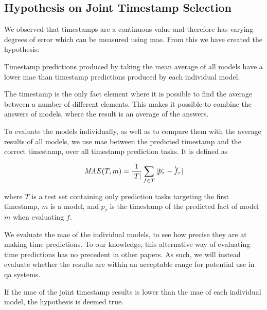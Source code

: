 \subsection{Hypothesis on Joint Timestamp Selection}
\label{sec:hypothesis_timestamp_voting}

We observed that timestamps are a continuous value and therefore has varying degrees of error which can be measured using \gls{mae}. From this we have created the hypothesis:

\begin{hypothesis}
\label{hyp:timestamp_voting}
Timestamp predictions produced by taking the mean average of all models have a lower \gls{mae} than timestamp predictions produced by each individual model.
\end{hypothesis}

The timestamp is the only fact element where it is possible to find the average between a number of different elements. This makes it possible to combine the answers of models, where the result is an average of the answers.

To evaluate the models individually, as well as to compare them with the average results of all models, we use \gls{mae} between the predicted timestamp and the correct timestamp, over all timestamp prediction tasks. It is defined as

\begin{equation}
\mathit{MAE}(T, m) = \frac{1}{|T|} \varsum_{f \in T} | \timebegin{p_\tau} - \timebegin{f_\tau} |
\end{equation}

\noindent
where $T$ is a test set containing only prediction tasks targeting the first timestamp, $m$ is a model, and $p_\tau$ is the timestamp of the predicted fact of model $m$ when evaluating $f$.

We evaluate the \gls{mae} of the individual models, to see how precise they are at making time predictions. To our knowledge, this alternative way of evaluating time predictions has no precedent in other papers. As such, we will instead evaluate whether the results are within an acceptable range for potential use in \gls{qa} systems.

If the \gls{mae} of the joint timestamp results is lower than the \gls{mae} of each individual model, the hypothesis is deemed true.